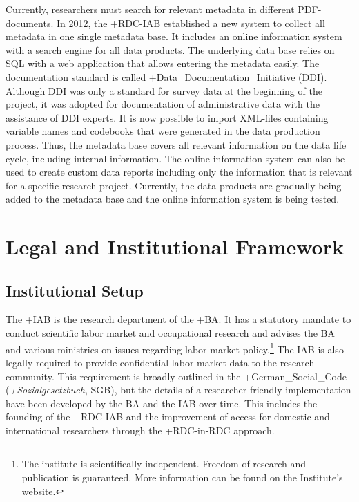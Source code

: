 \documentclass[
]{book}
\begin{document}
Currently, researchers must search for relevant metadata in different PDF-documents. In 2012, the +RDC-IAB\textbar{} established a new system to collect all metadata in one single metadata base. It includes an online information system with a search engine for all data products. The underlying data base relies on SQL with a web application that allows entering the metadata easily. The documentation standard is called +Data\_Documentation\_Initiative\textbar{} (DDI). Although DDI was only a standard for survey data at the beginning of the project, it was adopted for documentation of administrative data with the assistance of DDI experts. It is now possible to import XML-files containing variable names and codebooks that were generated in the data production process. Thus, the metadata base covers all relevant information on the data life cycle, including internal information. The online information system can also be used to create custom data reports including only the information that is relevant for a specific research project. Currently, the data products are gradually being added to the metadata base and the online information system is being tested.

\hypertarget{legal-and-institutional-framework}{%
\section{Legal and Institutional Framework}\label{legal-and-institutional-framework}}

\hypertarget{institutional-setup}{%
\subsection{Institutional Setup}\label{institutional-setup}}

The +IAB\textbar{} is the research department of the +BA\textbar. It has a statutory mandate to conduct scientific labor market and occupational research and advises the BA and various ministries on issues regarding labor market policy.\footnote{The institute is scientifically independent. Freedom of research and publication is guaranteed. More information can be found on the Institute's \href{https://www.iab.de/en/iab-aktuell.aspx}{website}.} The IAB is also legally required to provide confidential labor market data to the research community. This requirement is broadly outlined in the +German\_Social\_Code\textbar{} (\emph{+Sozialgesetzbuch\textbar{}}, SGB), but the details of a researcher-friendly implementation have been developed by the BA and the IAB over time. This includes the founding of the +RDC-IAB\textbar{} and the improvement of access for domestic and international researchers through the +RDC-in-RDC\textbar{} approach.
\end{document}
